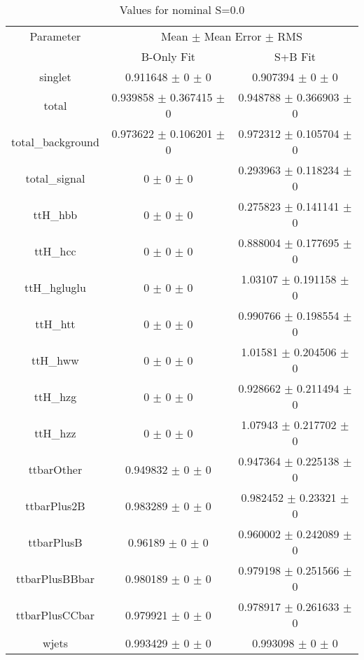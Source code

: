 \begin{table}
\centering
\caption{Values for nominal S=0.0}
\begin{tabular}{ccc}
\toprule
Parameter & \multicolumn{2}{c}{Mean $\pm$ Mean Error $\pm$ RMS}\\
 & B-Only Fit & S+B Fit\\
\midrule
singlet & \num{0.911648} $\pm$ \num{0} $\pm$ \num{0} & \num{0.907394} $\pm$ \num{0} $\pm$ \num{0}\\
total & \num{0.939858} $\pm$ \num{0.367415} $\pm$ \num{0} & \num{0.948788} $\pm$ \num{0.366903} $\pm$ \num{0}\\
total\_background & \num{0.973622} $\pm$ \num{0.106201} $\pm$ \num{0} & \num{0.972312} $\pm$ \num{0.105704} $\pm$ \num{0}\\
total\_signal & \num{0} $\pm$ \num{0} $\pm$ \num{0} & \num{0.293963} $\pm$ \num{0.118234} $\pm$ \num{0}\\
ttH\_hbb & \num{0} $\pm$ \num{0} $\pm$ \num{0} & \num{0.275823} $\pm$ \num{0.141141} $\pm$ \num{0}\\
ttH\_hcc & \num{0} $\pm$ \num{0} $\pm$ \num{0} & \num{0.888004} $\pm$ \num{0.177695} $\pm$ \num{0}\\
ttH\_hgluglu & \num{0} $\pm$ \num{0} $\pm$ \num{0} & \num{1.03107} $\pm$ \num{0.191158} $\pm$ \num{0}\\
ttH\_htt & \num{0} $\pm$ \num{0} $\pm$ \num{0} & \num{0.990766} $\pm$ \num{0.198554} $\pm$ \num{0}\\
ttH\_hww & \num{0} $\pm$ \num{0} $\pm$ \num{0} & \num{1.01581} $\pm$ \num{0.204506} $\pm$ \num{0}\\
ttH\_hzg & \num{0} $\pm$ \num{0} $\pm$ \num{0} & \num{0.928662} $\pm$ \num{0.211494} $\pm$ \num{0}\\
ttH\_hzz & \num{0} $\pm$ \num{0} $\pm$ \num{0} & \num{1.07943} $\pm$ \num{0.217702} $\pm$ \num{0}\\
ttbarOther & \num{0.949832} $\pm$ \num{0} $\pm$ \num{0} & \num{0.947364} $\pm$ \num{0.225138} $\pm$ \num{0}\\
ttbarPlus2B & \num{0.983289} $\pm$ \num{0} $\pm$ \num{0} & \num{0.982452} $\pm$ \num{0.23321} $\pm$ \num{0}\\
ttbarPlusB & \num{0.96189} $\pm$ \num{0} $\pm$ \num{0} & \num{0.960002} $\pm$ \num{0.242089} $\pm$ \num{0}\\
ttbarPlusBBbar & \num{0.980189} $\pm$ \num{0} $\pm$ \num{0} & \num{0.979198} $\pm$ \num{0.251566} $\pm$ \num{0}\\
ttbarPlusCCbar & \num{0.979921} $\pm$ \num{0} $\pm$ \num{0} & \num{0.978917} $\pm$ \num{0.261633} $\pm$ \num{0}\\
wjets & \num{0.993429} $\pm$ \num{0} $\pm$ \num{0} & \num{0.993098} $\pm$ \num{0} $\pm$ \num{0}\\
\bottomrule
\end{tabular}
\end{table}